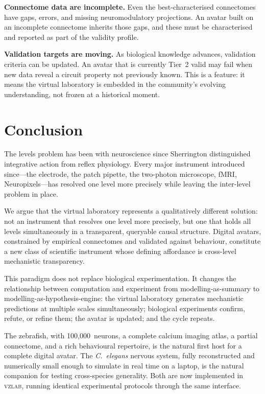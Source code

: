 \documentclass[12pt,a4paper]{article}
\begin{document}
\textbf{Connectome data are incomplete.}
Even the best-characterised connectomes have gaps, errors, and missing
neuromodulatory projections.
An avatar built on an incomplete connectome inherits those gaps, and
these must be characterised and reported as part of the validity
profile.

\textbf{Validation targets are moving.}
As biological knowledge advances, validation criteria can be updated.
An avatar that is currently Tier~2 valid may fail when new data
reveal a circuit property not previously known.
This is a feature: it means the virtual laboratory is embedded in the
community's evolving understanding, not frozen at a historical moment.


\section*{Conclusion}

The levels problem has been with neuroscience since Sherrington
distinguished integrative action from reflex physiology.
Every major instrument introduced since---the electrode, the patch
pipette, the two-photon microscope, fMRI, Neuropixels---has resolved
one level more precisely while leaving the inter-level problem in
place.

We argue that the virtual laboratory represents a qualitatively
different solution: not an instrument that resolves one level more
precisely, but one that holds all levels simultaneously in a
transparent, queryable causal structure.
Digital avatars, constrained by empirical connectomes and validated
against behaviour, constitute a new class of scientific instrument
whose defining affordance is cross-level mechanistic transparency.

This paradigm does not replace biological experimentation.
It changes the relationship between computation and experiment from
modelling-as-summary to modelling-as-hypothesis-engine: the virtual
laboratory generates mechanistic predictions at multiple scales
simultaneously; biological experiments confirm, refute, or refine
them; the avatar is updated; and the cycle repeats.

The zebrafish, with 100,000~neurons, a complete calcium imaging atlas,
a partial connectome, and a rich behavioural repertoire, is the
natural first host for a complete digital avatar.
The \textit{C.~elegans} nervous system, fully reconstructed and
numerically small enough to simulate in real time on a laptop, is the
natural companion for testing cross-species generality.
Both are now implemented in \textsc{vzlab}, running identical
experimental protocols through the same interface.
\end{document}
